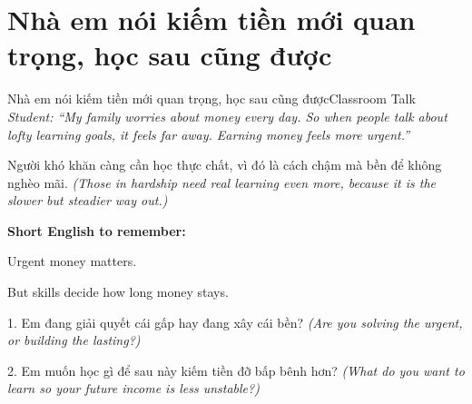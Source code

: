 \section{Nhà em nói kiếm tiền mới quan trọng, học sau cũng được}
\begin{truyen}{Nhà em nói kiếm tiền mới quan trọng, học sau cũng được}{Classroom Talk}
\textit{Student: ``My family worries about money every day. So when people talk about lofty learning goals, it feels far away. Earning money feels more urgent.''}\\[4pt]



\end{truyen}

\begin{baihoc}
Người khó khăn càng cần học thực chất, vì đó là cách chậm mà bền để không nghèo mãi.
\textit{(Those in hardship need real learning even more, because it is the slower but steadier way out.)}
\end{baihoc}

\begin{ghinhoanh}
\textbf{Short English to remember:}

Urgent money matters.

But skills decide how long money stays.
\end{ghinhoanh}

\begin{tuhocnhanh}
1. Em đang giải quyết cái gấp hay đang xây cái bền? \textit{(Are you solving the urgent, or building the lasting?)}

2. Em muốn học gì để sau này kiếm tiền đỡ bấp bênh hơn? \textit{(What do you want to learn so your future income is less unstable?)}
\end{tuhocnhanh}
\ngancach

